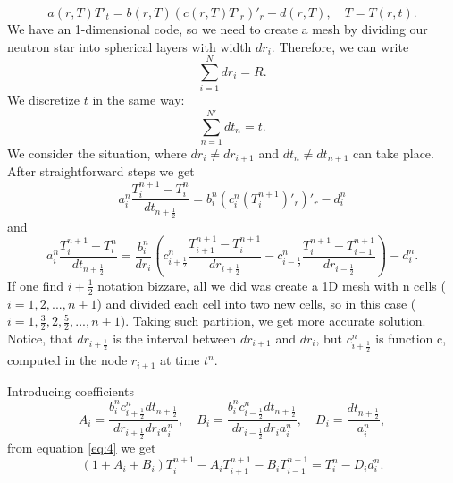 \documentclass[preprint,pre,floats,aps,amsmath,amssymb]{revtex4}
\begin{document}
\begin{equation*}
a(r,T) T'_{t} =  b(r,T)\left(c(r,T)T'_{r}\right)'_{r} - d(r,T), \quad T = T(r,t).
\end{equation*}
We have an 1-dimensional code, so we need to create a mesh by dividing our neutron star into
spherical layers with width $dr_{i}$. Therefore, we can write
\begin{equation*}
\sum\limits_{i=1}^{N}dr_{i} = R.
\end{equation*}
We discretize $t$ in the same way:
\begin{equation*}
\sum\limits_{n=1}^{N'}dt_{n} = t.
\end{equation*}
We consider the situation, where $dr_{i} \neq dr_{i+1}$ and $dt_{n} \neq dt_{n+1}$ can take place. After straightforward steps we get
\begin{equation*}
a_{i}^{n} \frac{T_{i}^{n+1} - T_{i}^{n}}{dt_{n+\frac{1}{2}}} =  b_{i}^{n}\left(c_{i}^{n} (T_{i}^{n+1})'_{r}\right)'_{r} - d_{i}^{n}
\end{equation*}
and
\begin{equation}
a_{i}^{n} \frac{T_{i}^{n+1} - T_{i}^{n}}{dt_{n+\frac{1}{2}}} =  \frac{b_{i}^{n}}{dr_{i}}\left(c_{i+\frac{1}{2}}^{n} \frac{T_{i+1}^{n+1} - T_{i}^{n+1}}{dr_{i+\frac{1}{2}}} - c_{i-\frac{1}{2}}^{n} \frac{T_{i}^{n+1} - T_{i-1}^{n+1}}{dr_{i-\frac{1}{2}}}\right) - d_{i}^{n}.
\label{eq:4}
\end{equation}
If one find $i+\frac{1}{2}$ notation bizzare, all we did was create a 1D mesh with n cells ($ i = 1, 2,..., n+1$) and divided each cell into two new cells, so in this case ($ i = 1, \frac{3}{2}, 2, \frac{5}{2},..., n+1$). Taking such partition, we get more accurate solution. Notice, that $dr_{i+\frac{1}{2}}$ is the interval between $dr_{i+1}$ and $dr_{i}$, but $c_{i+\frac{1}{2}}^{n}$ is function c, computed in the node $r_{i+1}$ at time $t^{n}$.
\par Introducing coefficients
\begin{equation*}
A_{i} = \frac{b_{i}^{n}c^{n}_{i+\frac{1}{2}}dt_{n+\frac{1}{2}}}{dr_{i+\frac{1}{2}}dr_{i}a_{i}^{n}}, \quad B_{i} = \frac{b_{i}^{n}c^{n}_{i-\frac{1}{2}}dt_{n+\frac{1}{2}}}{dr_{i-\frac{1}{2}}dr_{i}a_{i}^{n}}, \quad D_{i} = \frac{dt_{n+\frac{1}{2}}}{a^{n}_{i}},
\end{equation*}
from equation \ref{eq:4} we get 
\begin{equation*}
(1 +  A_{i} + B_{i})T_{i}^{n+1}  - A_{i}T_{i+1}^{n+1} - B_{i}T_{i-1}^{n+1} = T_{i}^{n} -  D_{i}d^{n}_{i}.
\end{equation*}
\end{document}
